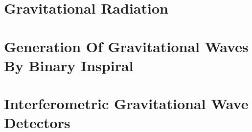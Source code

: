 \section{Gravitational Radiation}

\section{Generation Of Gravitational Waves By Binary Inspiral}

\section{Interferometric Gravitational Wave Detectors}

